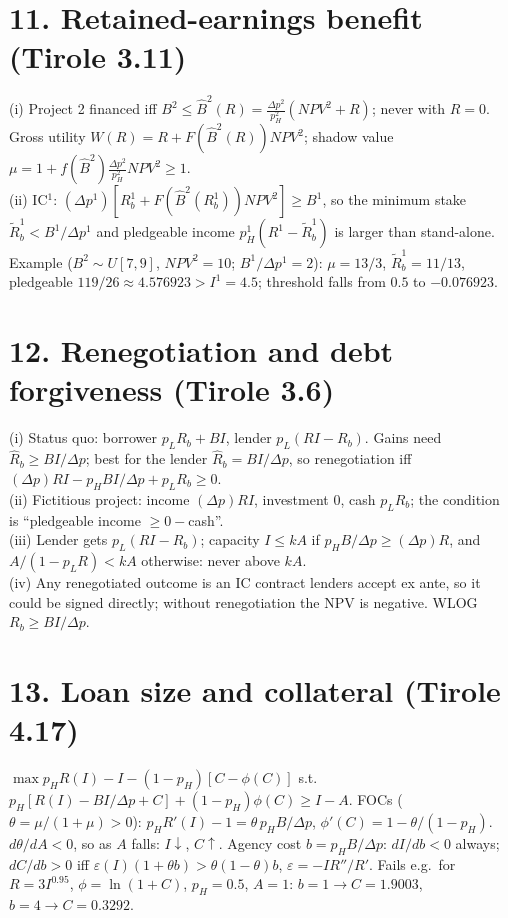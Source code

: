 \documentclass[11pt,a4paper]{article}
\begin{document}
\section*{11. Retained-earnings benefit (Tirole 3.11)}
(i) Project 2 financed iff $B^2\le\hat B^2(R)=\frac{\Delta p^2}{p_H^2}(\mathit{NPV}^2+R)$; never with $R=0$.
Gross utility $W(R)=R+F(\hat B^2(R))\mathit{NPV}^2$; shadow value
$\mu=1+f(\hat B^2)\frac{\Delta p^2}{p_H^2}\mathit{NPV}^2\ge1$.\\
(ii) IC$^1$: $(\Delta p^1)[R_b^1+F(\hat B^2(R_b^1))\mathit{NPV}^2]\ge B^1$, so the minimum stake
$\tilde R_b^1<B^1/\Delta p^1$ and pledgeable income $p_H^1(R^1-\tilde R_b^1)$ is larger than stand-alone.
Example ($B^2\sim U[7,9]$, $\mathit{NPV}^2=10$; $B^1/\Delta p^1=2$): $\mu=13/3$, $\tilde R_b^1=11/13$,
pledgeable $119/26\approx4.576923>I^1=4.5$; threshold falls from $0.5$ to $-0.076923$.

\section*{12. Renegotiation and debt forgiveness (Tirole 3.6)}
(i) Status quo: borrower $p_LR_b+BI$, lender $p_L(RI-R_b)$. Gains need $\hat R_b\ge BI/\Delta p$; best for
the lender $\hat R_b=BI/\Delta p$, so renegotiation iff $(\Delta p)RI-p_HBI/\Delta p+p_LR_b\ge0$.\\
(ii) Fictitious project: income $(\Delta p)RI$, investment $0$, cash $p_LR_b$; the condition is
``pledgeable income $\ge0-$cash''.\\
(iii) Lender gets $p_L(RI-R_b)$; capacity $I\le kA$ if $p_HB/\Delta p\ge(\Delta p)R$, and
$A/(1-p_LR)<kA$ otherwise: never above $kA$.\\
(iv) Any renegotiated outcome is an IC contract lenders accept ex ante, so it could be signed directly;
without renegotiation the NPV is negative. WLOG $R_b\ge BI/\Delta p$.

\section*{13. Loan size and collateral (Tirole 4.17)}
$\max p_HR(I)-I-(1-p_H)[C-\phi(C)]$ s.t.\ $p_H[R(I)-BI/\Delta p+C]+(1-p_H)\phi(C)\ge I-A$.
FOCs ($\theta=\mu/(1+\mu)>0$): $p_HR'(I)-1=\theta\,p_HB/\Delta p$, $\phi'(C)=1-\theta/(1-p_H)$.
$d\theta/dA<0$, so as $A$ falls: $I\downarrow$, $C\uparrow$. Agency cost $b=p_HB/\Delta p$: $dI/db<0$ always;
$dC/db>0$ iff $\varepsilon(I)(1+\theta b)>\theta(1-\theta)b$, $\varepsilon=-IR''/R'$. Fails e.g.\ for
$R=3I^{0.95}$, $\phi=\ln(1+C)$, $p_H=0.5$, $A=1$: $b=1\to C=1.9003$, $b=4\to C=0.3292$.
\end{document}

